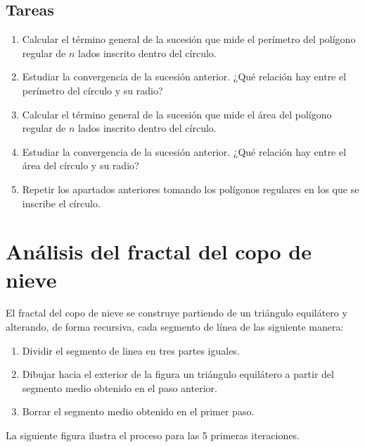 \documentclass[
  a4paper,
]{scrreport}
\providecommand{\tightlist}{%
  \setlength{\itemsep}{0pt}\setlength{\parskip}{0pt}}\usepackage{longtable,booktabs,array}
\begin{document}
\hypertarget{tareas}{%
\section{Tareas}\label{tareas}}

\begin{enumerate}
\def\labelenumi{\arabic{enumi}.}
\item
  Calcular el término general de la sucesión que mide el perímetro del
  polígono regular de \(n\) lados inscrito dentro del círculo.
\item
  Estudiar la convergencia de la sucesión anterior. ¿Qué relación hay
  entre el perímetro del círculo y su radio?
\item
  Calcular el término general de la sucesión que mide el área del
  polígono regular de \(n\) lados inscrito dentro del círculo.
\item
  Estudiar la convergencia de la sucesión anterior. ¿Qué relación hay
  entre el área del círculo y su radio?
\item
  Repetir los apartados anteriores tomando los polígonos regulares en
  los que se inscribe el círculo.
\end{enumerate}


\hypertarget{anuxe1lisis-del-fractal-del-copo-de-nieve}{%
\chapter{Análisis del fractal del copo de
nieve}\label{anuxe1lisis-del-fractal-del-copo-de-nieve}}

El fractal del copo de nieve se construye partiendo de un triángulo
equilátero y alterando, de forma recursiva, cada segmento de línea de
las siguiente manera:

\begin{enumerate}
\def\labelenumi{\arabic{enumi}.}
\tightlist
\item
  Dividir el segmento de linea en tres partes iguales.
\item
  Dibujar hacia el exterior de la figura un triángulo equilátero a
  partir del segmento medio obtenido en el paso anterior.
\item
  Borrar el segmento medio obtenido en el primer paso.
\end{enumerate}

La siguiente figura ilustra el proceso para las 5 primeras iteraciones.
\end{document}
